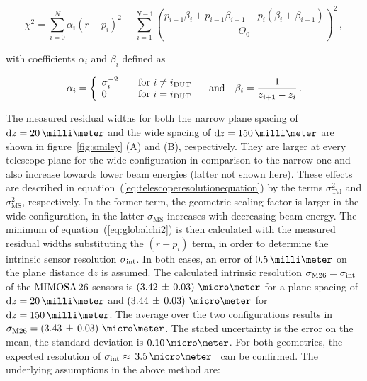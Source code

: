 \begin{equation}
\label{eq:globalchi2}
\chi^2 = \sum_{i=0}^{N} \alpha_i \left( r - p_i \right)^2 + \sum_{i=1}^{N-1}
\left( \frac{p_{i + 1} \beta_i + p_{i-1} \beta_{i-1} - p_i \left( \beta_i + \beta_{i-1} \right)}{\Theta_0} \right)^2 \,,
\end{equation}

\noindent
with coefficients $\alpha_i$ and $\beta_i$ defined as~\cite{ref:eudetmemo_2007_01}

\begin{equation}
\alpha_i = \left\{
  \begin{array}{l l}
    \sigma_{i}^{-2} & \quad \text{for $i \neq i_{\textrm{DUT}}$}\\
    0 & \quad \text{for $i = i_{\textrm{DUT}}$}
  \end{array} \right. \quad \text{and} \quad \beta_i = \frac{1}{z_{i + 1} - z_i} \,.
\end{equation}

\noindent
The measured residual widths for both the narrow plane spacing of $\dz = 20\,\milli\meter$ and the wide spacing of $\dz = 150\,\milli\meter$ are shown in figure~\ref{fig:smiley} (A) and (B), respectively. 
They are larger at every telescope plane for the wide configuration in comparison to the narrow one and also increase towards lower beam energies (latter not shown here). 
These effects are described in equation~(\ref{eq:telescoperesolutionequation}) by the terms $\sigma_{\textrm{Tel}}^2$ and $\sigma_{\textrm{MS}}^2$, respectively.
In the former term, the geometric scaling factor is larger in the wide configuration, in the latter $\sigma_{\textrm{MS}}$ increases with decreasing beam energy. 
The minimum of equation~(\ref{eq:globalchi2}) is then calculated with the measured residual widths substituting the $(r-p_i)$ term, in order to determine the intrinsic sensor resolution $\sigma_{\textrm{int}}$.
In both cases, an error of $0.5\,\milli\meter$ on the plane distance $\textrm{d}z$ is assumed.
The calculated intrinsic resolution $\sigma_{\textrm{M26}} = \sigma_{\textrm{int}}$ of the $\textrm{MIMOSA\,26}$ sensors is \allowbreak$\left( 3.42\,\pm\, \allowbreak 0.03 \right)\,\micro\meter$
 for a plane spacing of $\textrm{d}z =  20\,\milli\meter$ and $\left( 3.44\,\pm\, \allowbreak 0.03 \right)\,\micro\meter$ for $\textrm{d}z = 150\,\milli\meter$. 
The average over the two configurations results in $\sigma_{\textrm{M26}} = \left( 3.43\,\pm\, \allowbreak 0.03 \right)\,\micro\meter$. 
The stated uncertainty is the error on the mean, the standard deviation is $0.10\,\micro\meter$.
For both geometries, the expected resolution of $\sigmai \approx\,3.5\,\micro\meter$~\cite{ref:mimosa26} can be confirmed.
The underlying assumptions in the above method are:

